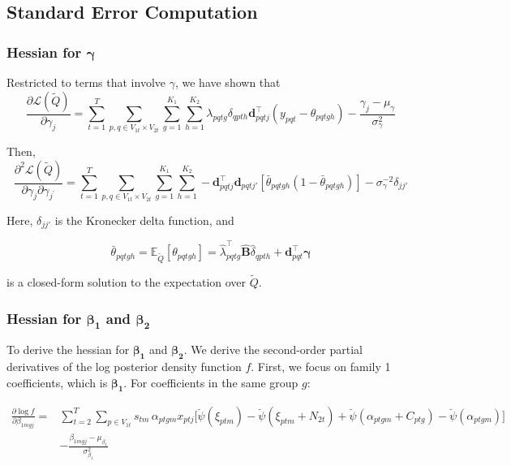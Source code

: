 \documentclass{article}
\begin{document}
\subsection{Standard Error Computation}
\newpage
\subsubsection{Hessian for $\boldsymbol{\gamma}$}
Restricted to terms that involve $\gamma$, we have shown that 
$$
\frac{\partial \mathcal{L}(\tilde{Q})}{\partial \gamma_j}=\sum_{t=1}^{T} \sum_{p, q \in V_{1t} \times V_{2t}} \sum_{g=1}^{K_1} \sum_{h=1}^{K_2} \lambda_{p  q t g} \delta_{q p t h} \mathbf{d}_{pqtj}^\top \left(y_{p q t}-\theta_{p q t g h}\right)- \frac{\gamma_{j}-\mu_{\gamma}}{\sigma_{\gamma}^{2}}
$$

Then, 
$$
\frac{\partial^2 \mathcal{L}(\tilde{Q})}{\partial \gamma_j \partial {\gamma_{j^{\prime}}}}= \sum_{t=1}^{T} \sum_{p, q \in V_{1t} \times V_{2t}} \sum_{g=1}^{K_1} \sum_{h=1}^{K_2} -\mathbf{d}_{pqtj}^\top \mathbf{d}_{pqtj\prime} \left[ \bar{\theta}_{p q t g h} (1-\bar{\theta}_{p q t g h}) \right] - \sigma_{\gamma}^{-2} \delta_{j j\prime}
$$

Here, $\delta_{j j\prime}$ is the Kronecker delta function, and 

$$
\bar{\theta}_{p q t g h}= \mathbb{E}_{\widetilde{Q}} \left[ \theta_{p q t g h} \right] = \hat{\lambda}_{p  q t g}^\top \hat{\mathbf{B}} \hat{\delta}_{q p t h}+ \mathbf{d}_{pqt}^\top \boldsymbol{\gamma} 
$$

is a closed-form solution to the expectation over $\widetilde{Q}$.


\subsubsection{Hessian for $\boldsymbol{\beta_{1}}$ and $\boldsymbol{\beta_{2}}$}
To derive the hessian for $\boldsymbol{\beta_{1}}$ and $\boldsymbol{\beta_{2}}$. We derive the second-order partial derivatives of the log posterior density function $f$. First, we focus on family 1 coefficients, which is $\boldsymbol{\beta_{1}}$. For coefficients in the same group $g$:

\begin{equation*}
\begin{aligned} 
\frac{\partial \log f}{\partial \beta_{1 m g j}} =&\sum_{t=2}^{T} \sum_{p \in V_{1t}} s_{tm} \, \alpha_{ptgm} x_{ptj}
\Big[
\breve{\psi}(\xi_{ptm}) - \breve{\psi}(\xi_{ptm} + N_{2t})
+ \breve{\psi}(\alpha_{ptgm} + C_{ptg}) - \breve{\psi}(\alpha_{ptgm})
\Big] \\
&- \frac{\beta_{1mgj} - \mu_{\beta_1}}{\sigma^2_{\beta_1}}
\end{aligned}
\end{equation*}
\end{document}
